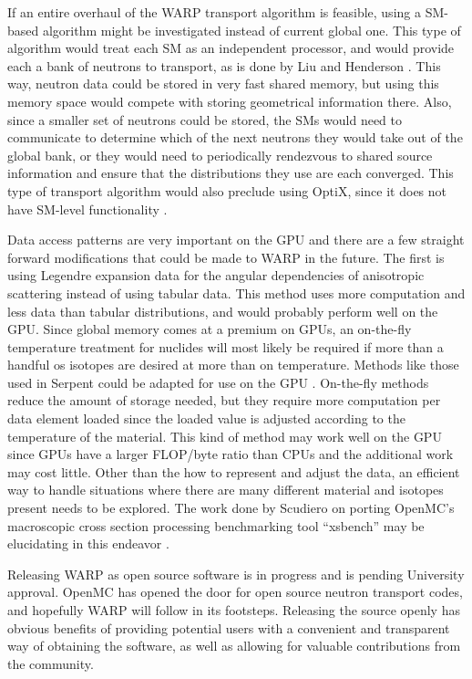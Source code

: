 If an entire overhaul of the WARP transport algorithm is feasible, using a SM-based algorithm might be investigated instead of current global one.  This type of algorithm would treat each SM as an independent processor, and would provide each a bank of neutrons to transport, as is done by Liu and Henderson \cite{tianyu,henderson}.   This way, neutron data could be stored in very fast shared memory, but using this memory space would compete with storing geometrical information there.  Also, since a smaller set of neutrons could be stored, the SMs would need to communicate to determine which of the next neutrons they would take out of the global bank, or they would need to periodically rendezvous to shared source information and ensure that the distributions they use are each converged.  This type of transport algorithm would also preclude using OptiX, since it does not have SM-level functionality \cite{optix}.

Data access patterns are very important on the GPU and there are a few straight forward modifications that could be made to WARP in the future.  The first is using Legendre expansion data for the angular dependencies of anisotropic scattering instead of using tabular data.  This method uses more computation and less data than tabular distributions, and would probably perform well on the GPU.  Since global memory comes at a premium on GPUs, an on-the-fly temperature treatment for nuclides will most likely be required if more than a handful os isotopes are desired at more than on temperature.  Methods like those used in Serpent could be adapted for use on the GPU \cite{serpent}.  On-the-fly methods reduce the amount of storage needed, but they require more computation per data element loaded since the loaded value is adjusted according to the temperature of the material.  This kind of method may work well on the GPU since GPUs have a larger FLOP/byte ratio than CPUs and the additional work may cost little.  Other than the how to represent and adjust the data, an efficient way to handle situations where there are many different material and isotopes present needs to be explored.  The work done by Scudiero on porting OpenMC's macroscopic cross section processing benchmarking tool ``xsbench'' may be elucidating in this endeavor \cite{openmc,scudiero}.

Releasing WARP as open source software is in progress and is pending University approval.  OpenMC has opened the door for open source neutron transport codes, and hopefully WARP will follow in its footsteps.  Releasing the source openly has obvious benefits of providing potential users with a convenient and transparent way of obtaining the software, as well as allowing for valuable contributions from the community.  






